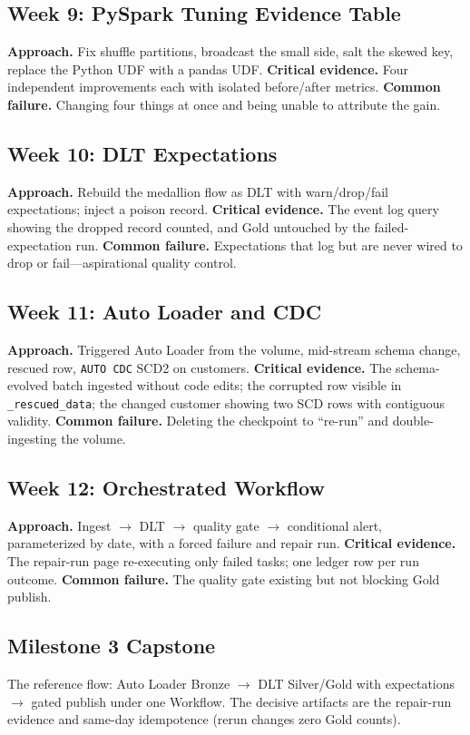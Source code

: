 \subsection{Week 9: PySpark Tuning Evidence Table}
\textbf{Approach.} Fix shuffle partitions, broadcast the small side, salt the skewed key, replace
the Python UDF with a pandas UDF.
\textbf{Critical evidence.} Four independent improvements each with isolated before/after metrics.
\textbf{Common failure.} Changing four things at once and being unable to attribute the gain.

\subsection{Week 10: DLT Expectations}
\textbf{Approach.} Rebuild the medallion flow as DLT with warn/drop/fail expectations; inject a
poison record.
\textbf{Critical evidence.} The event log query showing the dropped record counted, and Gold
untouched by the failed-expectation run.
\textbf{Common failure.} Expectations that log but are never wired to drop or fail---aspirational
quality control.

\subsection{Week 11: Auto Loader and CDC}
\textbf{Approach.} Triggered Auto Loader from the volume, mid-stream schema change, rescued row,
\texttt{AUTO CDC} SCD2 on customers.
\textbf{Critical evidence.} The schema-evolved batch ingested without code edits; the corrupted row
visible in \texttt{\_rescued\_data}; the changed customer showing two SCD rows with contiguous
validity.
\textbf{Common failure.} Deleting the checkpoint to ``re-run'' and double-ingesting the volume.

\subsection{Week 12: Orchestrated Workflow}
\textbf{Approach.} Ingest $\rightarrow$ DLT $\rightarrow$ quality gate $\rightarrow$ conditional
alert, parameterized by date, with a forced failure and repair run.
\textbf{Critical evidence.} The repair-run page re-executing only failed tasks; one ledger row per
run outcome.
\textbf{Common failure.} The quality gate existing but not blocking Gold publish.

\subsection{Milestone 3 Capstone}
The reference flow: Auto Loader Bronze $\rightarrow$ DLT Silver/Gold with expectations
$\rightarrow$ gated publish under one Workflow. The decisive artifacts are the repair-run evidence
and same-day idempotence (rerun changes zero Gold counts).

